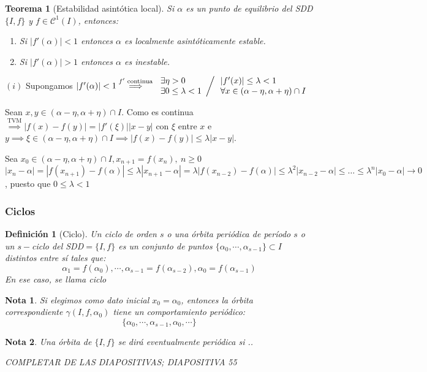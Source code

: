 \documentclass[11pt, a4paper, titlepage]{article}
\makeatletter
\renewenvironment{proof}[1][\proofname] {\vspace{-15pt}\par\pushQED{\qed}\normalfont\topsep6\p@\@plus6\p@\relax\trivlist\item[\hskip\labelsep\it#1\@addpunct{.}]\ignorespaces}{\popQED\endtrivlist\@endpefalse}
\theoremstyle{theorem-style}
\newtheorem*{nth}{Teorema}
\theoremstyle{definition-style}
\newtheorem*{ndef}{Definición}
\theoremstyle{remark-style}
\newtheorem*{nota}{Nota}
\theoremstyle{example-style}
\newenvironment{nlist}
{\begin{enumerate}
\renewcommand\labelenumi{(\emph{\roman{enumi})}}}
{\end{enumerate}}
\makeatother
\begin{document}
\begin{nth}[Estabilidad asintótica local]
	Si $\alpha$ es un punto de equilibrio del SDD $\{I,f\}$ y $f \in \mathcal{C}^1(I)$, entonces:
\begin{nlist}
 \item Si $|f'(\alpha)| < 1$ entonces $\alpha$ es localmente asintóticamente estable.
 \item Si $|f'(\alpha)| > 1$ entonces $\alpha$ es inestable.
\end{nlist}
\end{nth}
\begin{proof}
	$(i)$ Supongamos $|f'(\alpha)| < 1 \stackrel{f' \text{ continua}}{\implies} \left.\begin{array}{l}
		\exists \eta > 0 \\
		\exists 0 \leq \lambda < 1	
	\end{array}\right/\begin{array}{l}
		|f'(x)| \leq \lambda < 1\\
		\forall x \in (\alpha-\eta,\alpha+\eta)\cap I
\end{array}$

Sean $x,y \in (\alpha-\eta,\alpha+\eta)\cap I$. Como es continua $\stackrel{\text{TVM}}{\implies} |f(x)-f(y)| = |f'(\xi)||x-y|$ con $\xi$ entre $x$ e $y \implies \xi \in (\alpha-\eta,\alpha+\eta)\cap I \implies |f(x)-f(y)| \leq \lambda |x-y|$.

Sea $x_0 \in (\alpha-\eta,\alpha+\eta)\cap I, x_{n+1} = f(x_n),\ n \geq 0$
$|x_n-\alpha| = |f(x_{n+1})-f(\alpha)| \leq \lambda|x_{n+1}-\alpha|=\lambda|f(x_{n-2})-f(\alpha)| \leq \lambda^2|x_{n-2}-\alpha| \leq \dots \leq \lambda^n|x_0-\alpha|\rightarrow0$, puesto que $0 \leq \lambda < 1$
\end{proof}

\subsubsection{Ciclos}
\begin{ndef}[Ciclo]
	Un ciclo de orden $s$ o una órbita periódica de período $s$ o un $s-$ciclo del SDD$=\{I,f\}$ es un conjunto de puntos $\{\alpha_0, \cdots, \alpha_{s-1}\}\subset I$ distintos entre sí tales que:
	\[
	\alpha_1 = f(\alpha_0), \cdots, \alpha_{s-1}= f(\alpha_{s-2}), \alpha_0 = f(\alpha_{s-1})
	\]
	En ese caso, se llama ciclo
\end{ndef}
\begin{nota}
	Si elegimos como dato inicial $x_0 = \alpha_0$, entonces la órbita correspondiente $\gamma(I,f,\alpha_0)$ tiene un comportamiento periódico:
	\[
	\{\alpha_0,\cdots,\alpha_{s-1},\alpha_0,\cdots\}
	\]
\end{nota}
\begin{nota}
	Una órbita de $\{I,f\}$ se dirá eventualmente periódica si ..
	
	COMPLETAR DE LAS DIAPOSITIVAS; DIAPOSITIVA 55
\end{nota}
\end{document}
